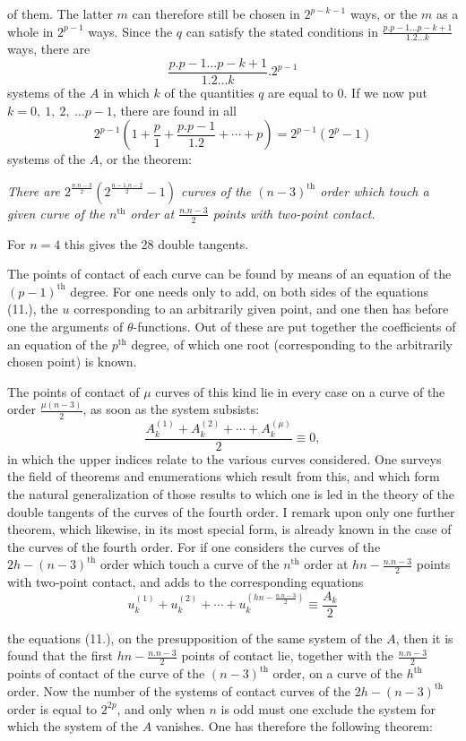 \documentclass{article}
\begin{document}
of them. The latter $m$ can therefore still be chosen in $2^{p-k-1}$ ways, or the $m$ as a whole in $2^{p-1}$ ways. Since the $q$ can satisfy the stated conditions in $\frac{p.p-1\ldots p-k+1}{1.2\ldots k}$ ways, there are
\[
\frac{p.p-1\ldots p-k+1}{1.2\ldots k}.2^{p-1}
\]
systems of the $A$ in which $k$ of the quantities $q$ are equal to 0. If we now put $k = 0,\ 1,\ 2,\ \ldots p-1$, there are found in all
\[
2^{p-1}\left(1+\frac{p}{1}+\frac{p.p-1}{1.2}+\cdots+p\right) = 2^{p-1}(2^{p}-1)
\]
systems of the $A$, or the theorem:

\emph{There are $2^{\frac{n.n-3}{2}}\left(2^{\frac{n-1.n-2}{2}}-1\right)$ curves of the $(n-3)^{\text{th}}$ order which touch a given curve of the $n^{\text{th}}$ order at $\frac{n.n-3}{2}$ points with two-point contact.}

For $n=4$ this gives the 28 double tangents.

The points of contact of each curve can be found by means of an equation of the $(p-1)^{\text{th}}$ degree. For one needs only to add, on both sides of the equations (11.), the $u$ corresponding to an arbitrarily given point, and one then has before one the arguments of $\theta$-functions. Out of these are put together the coefficients of an equation of the $p^{\text{th}}$ degree, of which one root (corresponding to the arbitrarily chosen point) is known.

The points of contact of $\mu$ curves of this kind lie in every case on a curve of the order $\frac{\mu(n-3)}{2}$, as soon as the system subsists:
\[
\frac{A_{k}^{(1)}+A_{k}^{(2)}+\cdots+A_{k}^{(\mu)}}{2} \equiv 0,
\]
in which the upper indices relate to the various curves considered. One surveys the field of theorems and enumerations which result from this, and which form the natural generalization of those results to which one is led in the theory of the double tangents of the curves of the fourth order. I remark upon only one further theorem, which likewise, in its most special form, is already known in the case of the curves of the fourth order. For if one considers the curves of the $2h-(n-3)^{\text{th}}$ order which touch a curve of the $n^{\text{th}}$ order at $hn-\frac{n.n-3}{2}$ points with two-point contact, and adds to the corresponding equations
\[
u_{k}^{(1)}+u_{k}^{(2)}+\cdots+u_{k}^{\left(hn-\frac{n.n-3}{2}\right)} \equiv \frac{A_{k}}{2}
\]

the equations (11.), on the presupposition of the same system of the $A$, then it is found that the first $hn-\frac{n.n-3}{2}$ points of contact lie, together with the $\frac{n.n-3}{2}$ points of contact of the curve of the $(n-3)^{\text{th}}$ order, on a curve of the $h^{\text{th}}$ order. Now the number of the systems of contact curves of the $2h-(n-3)^{\text{th}}$ order is equal to $2^{2p}$, and only when $n$ is odd must one exclude the system for which the system of the $A$ vanishes. One has therefore the following theorem:
\end{document}
